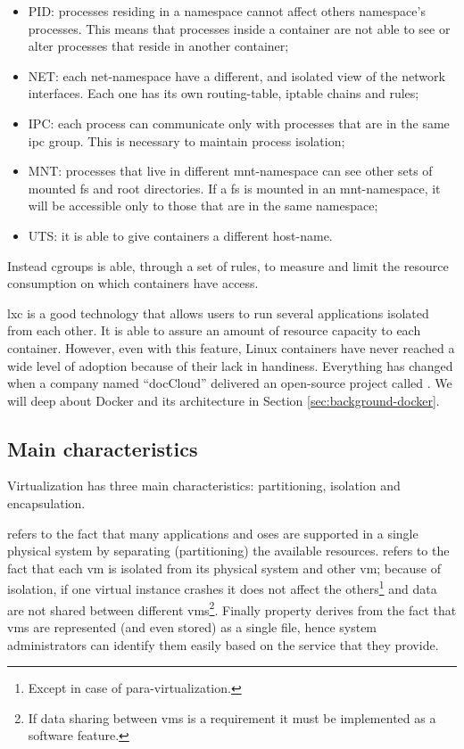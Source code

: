 \begin{itemize}
	\item{PID: processes residing in a namespace cannot affect others namespace's processes. This
		means that processes inside a container are not able to see or alter processes that reside in
		another container;}
	\item{NET: each net-namespace have a different, and isolated view of the network interfaces. Each
		one has its own routing-table, iptable chains and rules;}
	\item{IPC: each process can communicate only with processes that are in the same \ac{ipc} group. This
		is necessary to maintain process isolation;}
	\item{MNT: processes that live in different mnt-namespace can see other sets of mounted \ac{fs} and
		root directories. If a \ac{fs} is mounted in an mnt-namespace, it will be accessible only to those
		that are in the same namespace;}
	\item{UTS: it is able to give containers a different host-name.}
\end{itemize}

Instead cgroups is able, through a set of rules, to measure and limit the resource consumption on which
containers have access.

\ac{lxc} is a good technology that allows users to run several applications isolated from each other. It
is able to assure an amount of resource capacity to each container. However, even with this feature,
Linux containers have never reached a wide level of adoption because of their lack in handiness. Everything
has changed when a company named ``docCloud'' delivered an open-source project called .
We will deep about Docker and its architecture in Section \ref{sec:background-docker}.

\subsection{Main characteristics}
\label{sec:background-virtualization-characteristics}
Virtualization has three main characteristics: partitioning, isolation and encapsulation.

 refers to the fact that many applications and \acs{os}es are supported in a single 
physical system by separating (partitioning) the available resources.  refers to the
fact that each \ac{vm} is isolated from its physical system and other \ac{vm}; because of isolation, if
one virtual instance crashes it does not affect the others\footnote{Except in case of para-virtualization.}
and data are not shared between different \ac{vm}s\footnote{If data sharing between \ac{vm}s is a requirement
it must be implemented as a software feature.}. Finally  property derives from
the fact that \ac{vm}s are represented (and even stored) as a single file, hence system administrators
can identify them easily based on the service that they provide.

